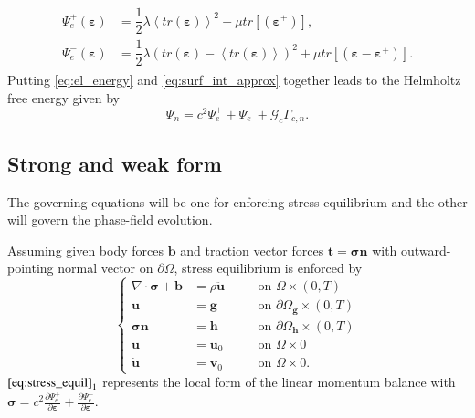 \begin{align} \label{eq:psi_e+-}
	\begin{aligned}
		\Psi_{e}^{+}\left(\bm{\varepsilon}\right) &= \dfrac{1}{2}\lambda\left<tr\left(\bm{\varepsilon}\right)\right>^{2}+\mu tr\left[\left(\bm{\varepsilon}^{+}\right)\right], \\
		\Psi_{e}^{-}\left(\bm{\varepsilon}\right) &= \dfrac{1}{2}\lambda\left(tr\left(\bm{\varepsilon}\right)-\left<tr\left(\bm{\varepsilon}\right)\right>\right)^{2}+\mu tr\left[\left(\bm{\varepsilon}-\bm{\varepsilon}^{+}\right)\right].
	\end{aligned}
\end{align}
Putting \eqref{eq:el_energy} and \eqref{eq:surf_int_approx} together leads to the Helmholtz free energy given by
\begin{equation} \label{eq:Helmholtz}
	\Psi_{n}=c^{2}\Psi_{e}^{+}+\Psi_{e}^{-}+\mathcal{G}_{c}\Gamma_{c,n}.
\end{equation}

\subsection{Strong and weak form}
The governing equations will be one for enforcing stress equilibrium and the other will govern the phase-field evolution.

Assuming given body forces $\mathbf{b}$ and traction vector forces $\mathbf{t}=\bm{\sigma}\mathbf{n}$ with outward-pointing normal vector on $\partial\Omega$, stress equilibrium is enforced by
\begin{equation} \label{eq:stress_equil}
	 \left\{\begin{alignedat}{2}
\nabla\cdot\bm{\sigma}+\mathbf{b} &= \rho\ddot{\mathbf{u}} && \quad\text{on } \Omega\times\left(0,T\right) \\
		\mathbf{u} &= \mathbf{g} && \quad\text{on } \partial\Omega_{\mathbf{g}}\times\left(0,T\right) \\
		\bm{\sigma}\mathbf{n} &= \mathbf{h} && \quad\text{on } \partial\Omega_{\mathbf{h}}\times\left(0,T\right) \\
		\mathbf{u} &= \mathbf{u}_{0} && \quad\text{on } \Omega\times0 \\
		\dot{\mathbf{u}} &= \mathbf{v}_{0} && \quad\text{on } \Omega\times0.
  \end{alignedat}\right.
\end{equation}
$\eqref{eq:stress_equil}_{1}$ represents the local form of the linear momentum balance with $\bm{\sigma}=c^{2}\frac{\partial\Psi_{e}^{+}}{\partial\bm{\varepsilon}}+\frac{\partial\Psi_{e}^{-}}{\partial\bm{\varepsilon}}$.

